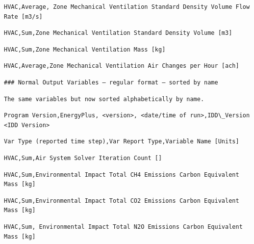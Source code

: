 \begin{lstlisting}
HVAC,Average, Zone Mechanical Ventilation Standard Density Volume Flow Rate [m3/s]
\end{lstlisting}

\begin{lstlisting}
HVAC,Sum,Zone Mechanical Ventilation Standard Density Volume [m3]
\end{lstlisting}

\begin{lstlisting}
HVAC,Sum,Zone Mechanical Ventilation Mass [kg]
\end{lstlisting}

\begin{lstlisting}
HVAC,Average,Zone Mechanical Ventilation Air Changes per Hour [ach]
\end{lstlisting}

\begin{lstlisting}
### Normal Output Variables – regular format – sorted by name
\end{lstlisting}

\begin{lstlisting}
The same variables but now sorted alphabetically by name.
\end{lstlisting}

\begin{lstlisting}
Program Version,EnergyPlus, <version>, <date/time of run>,IDD\_Version <IDD Version>
\end{lstlisting}

\begin{lstlisting}
Var Type (reported time step),Var Report Type,Variable Name [Units]
\end{lstlisting}

\begin{lstlisting}
HVAC,Sum,Air System Solver Iteration Count []
\end{lstlisting}

\begin{lstlisting}
HVAC,Sum,Environmental Impact Total CH4 Emissions Carbon Equivalent Mass [kg]
\end{lstlisting}

\begin{lstlisting}
HVAC,Sum,Environmental Impact Total CO2 Emissions Carbon Equivalent Mass [kg]
\end{lstlisting}

\begin{lstlisting}
HVAC,Sum, Environmental Impact Total N2O Emissions Carbon Equivalent Mass [kg]
\end{lstlisting}

